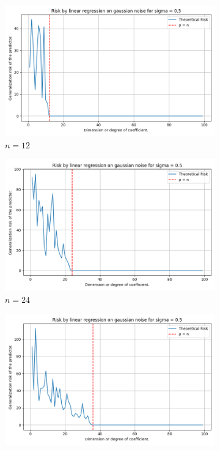 \documentclass[10pt,oneside,oldfontcommands,dvipsnames,article]{memoir}
\begin{document}
\begin{figure}[htb]
  \centering
  \newcommand{\imgwidth}{0.24\textwidth}

  \begin{subfigure}[b]{\imgwidth}
    \includegraphics[width=\linewidth]{img/descent_devel_t1.png}
    \caption{$n=12$}\label{fig:1a21}
  \end{subfigure}%
  \hfill
  \begin{subfigure}[b]{\imgwidth}
    \includegraphics[width=\linewidth]{img/descent_devel_t2.png}
    \caption{$n=24$}\label{fig:1b21}
  \end{subfigure}%
  \hfill
  \begin{subfigure}[b]{\imgwidth}
    \includegraphics[width=\linewidth]{img/descent_devel_t3.png}

\end{subfigure}
\end{figure}
\end{document}

